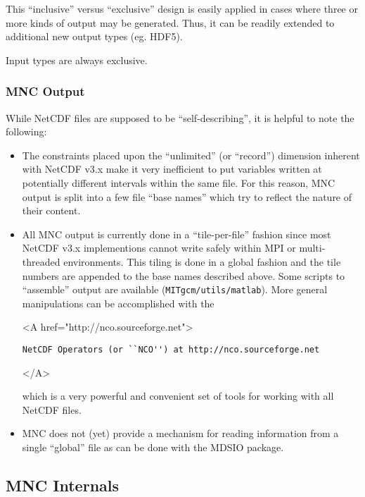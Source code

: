 This ``inclusive'' versus ``exclusive'' design is easily applied in
cases where three or more kinds of output may be generated.  Thus, it
can be readily extended to additional new output types (eg. HDF5).

Input types are always exclusive.

\subsubsection{MNC Output}

While NetCDF files are supposed to be ``self-describing'', it is
helpful to note the following:

\begin{itemize}
\item The constraints placed upon the ``unlimited'' (or ``record'')
  dimension inherent with NetCDF v3.x make it very inefficient to put
  variables written at potentially different intervals within the same
  file.  For this reason, MNC output is split into a few file ``base
  names'' which try to reflect the nature of their content.
  
\item All MNC output is currently done in a ``tile-per-file'' fashion
  since most NetCDF v3.x implementions cannot write safely within MPI
  or multi-threaded environments.  This tiling is done in a global
  fashion and the tile numbers are appended to the base names
  described above.  Some scripts to ``assemble'' output are available
  (\texttt{MITgcm/utils/matlab}).  More general manipulations can be
  accomplished with the
  \begin{rawhtml}
    <A href="http://nco.sourceforge.net"> 
  \end{rawhtml} 
\begin{verbatim}
NetCDF Operators (or ``NCO'') at http://nco.sourceforge.net
\end{verbatim}
  \begin{rawhtml} </A> \end{rawhtml}
  which is a very powerful and convenient set of tools for working
  with all NetCDF files.
  
\item MNC does not (yet) provide a mechanism for reading information
  from a single ``global'' file as can be done with the MDSIO
  package.

\end{itemize}


\subsection{MNC Internals}


